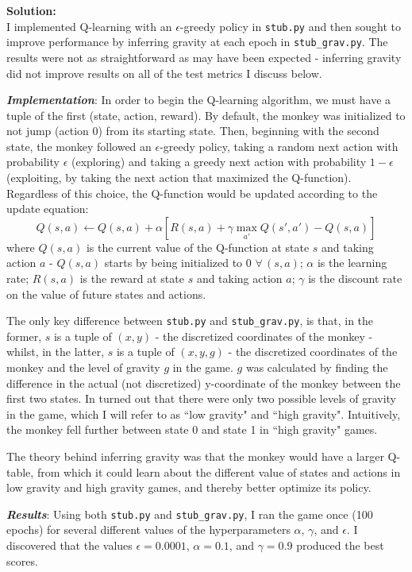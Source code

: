 \documentclass[submit]{harvardml}
\begin{document}
\textbf{Solution:}\\
I implemented Q-learning with an $\epsilon$-greedy policy in \texttt{stub.py} and then sought to improve performance by inferring gravity at each epoch in \texttt{stub\_grav.py}. The results were not as straightforward as may have been expected - inferring gravity did not improve results on all of the test metrics I discuss below.

\textit{\textbf{Implementation}}: In order to begin the Q-learning algorithm, we must have a tuple of the first (state, action, reward). By default, the monkey was initialized to not jump (action 0) from its starting state. Then, beginning with the second state, the monkey followed an $\epsilon$-greedy policy, taking a random next action with probability $\epsilon$ (exploring) and taking a greedy next action with probability $1 - \epsilon$ (exploiting, by taking the next action that maximized the Q-function). Regardless of this choice, the Q-function would be updated according to the update equation:
$$Q(s,a) \leftarrow Q(s,a) + \alpha[R(s,a) + \gamma \max_{a'} Q(s',a') - Q(s,a)] $$
where $Q(s,a)$ is the current value of the Q-function at state $s$ and taking action $a$ - $Q(s,a)$ starts by being initialized to 0 $\forall\, (s,a)$; $\alpha$ is the learning rate; $R(s,a)$ is the reward at state $s$ and taking action $a$; $\gamma$ is the discount rate on the value of future states and actions.

The only key difference between \texttt{stub.py} and \texttt{stub\_grav.py}, is that, in the former, $s$ is a tuple of $(x,y)$ - the discretized coordinates of the monkey - whilst, in the latter, $s$ is a tuple of $(x,y,g)$ - the discretized coordinates of the monkey and the level of gravity $g$ in the game. $g$ was calculated by finding the difference in the actual (not discretized) y-coordinate of the monkey between the first two states. In turned out that there were only two possible levels of gravity in the game, which I will refer to as ``low gravity" and ``high gravity". Intuitively, the monkey fell further between state 0 and state 1 in ``high gravity" games.

The theory behind inferring gravity was that the monkey would have a larger Q-table, from which it could learn about the different value of states and actions in low gravity and high gravity games, and thereby better optimize its policy.

\textit{\textbf{Results}}:
Using both \texttt{stub.py} and \texttt{stub\_grav.py}, I ran the game once (100 epochs) for several different values of the hyperparameters $\alpha$, $\gamma$, and $\epsilon$. I discovered that the values $\epsilon = 0.0001$, $\alpha = 0.1$, and $\gamma = 0.9$ produced the best scores.
\end{document}
